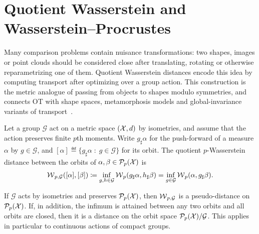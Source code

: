 \section{Quotient Wasserstein and Wasserstein--Procrustes}
\label{sec-quotient-wasserstein-procrustes}

Many comparison problems contain nuisance transformations: two shapes, images or point clouds should be considered close after translating, rotating or otherwise reparametrizing one of them. Quotient Wasserstein distances encode this idea by computing transport after optimizing over a group action. This construction is the metric analogue of passing from objects to shapes modulo symmetries, and connects OT with shape spaces, metamorphosis models and global-invariance variants of transport~\cite{Metamorphosis2005,trouve2005metamorphoses,zemel2017fr,alvarez2018towards}.

\begin{defn}\label{def-quotient-wasserstein}
	Let a group $\mathcal G$ act on a metric space $(\mathcal{X},d)$ by isometries, and assume that the action preserves finite $p$th moments. Write $g_\sharp\alpha$ for the push-forward of a measure $\alpha$ by $g\in\mathcal G$, and $[\alpha]\eqdef\{g_\sharp\alpha\;:\;g\in\mathcal G\}$ for its orbit. The quotient $p$-Wasserstein distance between the orbits of $\alpha,\beta\in\mathcal{P}_p(\mathcal{X})$ is
	\[
		\operatorname{\mathcal{W}}_{p,\mathcal G}([\alpha],[\beta])
		\coloneqq
		\inf_{g,h\in\mathcal G}\operatorname{\mathcal{W}}_p(g_\sharp\alpha,h_\sharp\beta)
		=
		\inf_{g\in\mathcal G}\operatorname{\mathcal{W}}_p(\alpha,g_\sharp\beta).
	\]
\end{defn}

\begin{prop}\label{prop-quotient-wasserstein-metric}
	If $\mathcal G$ acts by isometries and preserves $\mathcal{P}_p(\mathcal{X})$, then $\operatorname{\mathcal{W}}_{p,\mathcal G}$ is a pseudo-distance on $\mathcal{P}_p(\mathcal{X})$. If, in addition, the infimum is attained between any two orbits and all orbits are closed, then it is a distance on the orbit space $\mathcal{P}_p(\mathcal{X})/\mathcal G$. This applies in particular to continuous actions of compact groups.
\end{prop}

